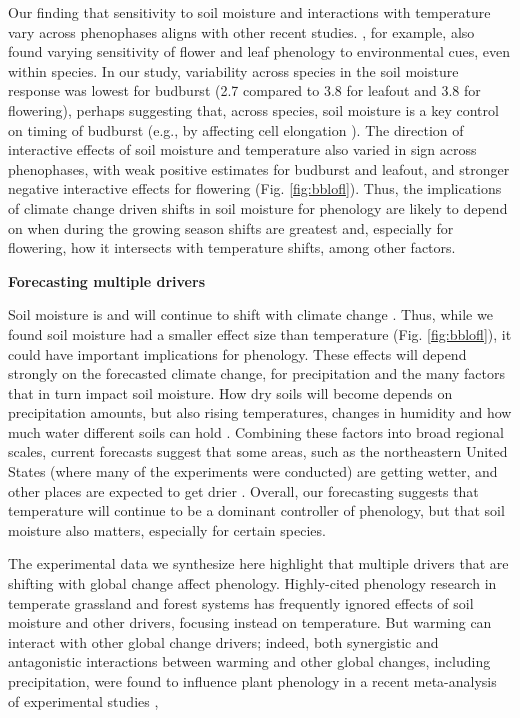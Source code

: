 \documentclass{article}
\begin{document}
\par Our finding that sensitivity to soil moisture and interactions with temperature vary across phenophases aligns with other recent studies. \citet{buonaiuto2021differences}, for example, also found varying sensitivity of flower and leaf phenology to environmental cues, even within species. In our study, variability across species in the soil moisture response was lowest for budburst (2.7 compared to 3.8 for leafout and  3.8 for flowering), perhaps suggesting that, across species, soil moisture is a key control on timing of budburst (e.g., by affecting cell elongation \citep{essiamah1986}). The direction of interactive effects of soil moisture and temperature also varied in sign across phenophases, with weak positive estimates for budburst and leafout, and stronger negative interactive effects for flowering (Fig. \ref{fig:bblofl}). 
Thus, the implications of climate change driven shifts in soil moisture for phenology are likely to depend on when during the growing season shifts are greatest and, especially for flowering, how it intersects with temperature shifts, among other factors. 

\textbf {Forecasting multiple drivers} 
\par Soil moisture is and will continue to shift with climate change \citep{berg2017}. Thus, while we found soil moisture had a smaller effect size than temperature (Fig. \ref{fig:bblofl}), it could have important implications for phenology. These effects will depend strongly on the forecasted climate change, for precipitation and the many factors that in turn impact soil moisture. How dry soils will become depends on precipitation amounts, but also rising temperatures, changes in humidity and how much water different soils can hold \citep{mchugh2015water,guerreiro2022contribution,williams2009controls}. Combining these factors into broad regional scales, current forecasts suggest that some areas, such as the northeastern United States (where many of the experiments were conducted) are getting wetter, and other places are expected to get drier \citep{berg2017}. Overall, our forecasting suggests that temperature will continue to be a dominant controller of phenology, but that soil moisture also matters, especially for certain species. 

\par The experimental data we synthesize here highlight that multiple drivers that are shifting with global change affect phenology. Highly-cited phenology research in temperate grassland and forest systems has frequently ignored effects of soil moisture and other drivers, focusing instead on temperature. But warming can interact with other global change drivers; indeed, both synergistic and antagonistic interactions between warming and other global changes, including precipitation, were found to influence plant phenology in a recent meta-analysis of experimental studies \citep{zhou2023climate},
\end{document}
